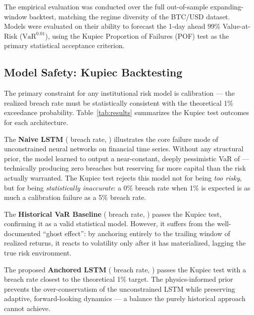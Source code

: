 

The empirical evaluation was conducted over the full out-of-sample expanding-window backtest, matching the regime diversity of the BTC/USD dataset. Models were evaluated on their ability to forecast the 1-day ahead 99\% Value-at-Risk ($\text{VaR}^{0.01}$), using the Kupiec Proportion of Failures (POF) test \cite{kupiec1995techniques,christoffersen1998evaluating} as the primary statistical acceptance criterion.

\subsection{Model Safety: Kupiec Backtesting}

The primary constraint for any institutional risk model is calibration — the realized breach rate must be statistically consistent with the theoretical 1\% exceedance probability. Table~\ref{tab:results} summarizes the Kupiec test outcomes for each architecture.

The \textbf{Naive LSTM} (\JustTraintheModelBreachRate{} breach rate, \JustTraintheModelKupiec{}) illustrates the core failure mode of unconstrained neural networks on financial time series. Without any structural prior, the model learned to output a near-constant, deeply pessimistic VaR of \JustTraintheModelMeanVaR{} — technically producing zero breaches but reserving far more capital than the risk actually warranted. The Kupiec test rejects this model not for being \emph{too risky}, but for being \emph{statistically inaccurate}: a 0\% breach rate when 1\% is expected is as much a calibration failure as a 5\% breach rate.

The \textbf{Historical VaR Baseline} (\HistoricalVaRBreachRate{} breach rate, \HistoricalVaRKupiec{}) passes the Kupiec test, confirming it as a valid statistical model. However, it suffers from the well-documented ``ghost effect'': by anchoring entirely to the trailing window of realized returns, it reacts to volatility only after it has materialized, lagging the true risk environment.

The proposed \textbf{Anchored LSTM} (\PhysicsInformedBreachRate{} breach rate, \PhysicsInformedKupiec{}) passes the Kupiec test with a breach rate closest to the theoretical 1\% target. The physics-informed prior prevents the over-conservatism of the unconstrained LSTM while preserving adaptive, forward-looking dynamics — a balance the purely historical approach cannot achieve.

